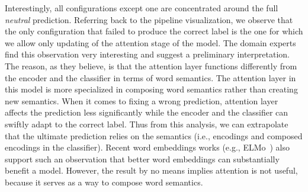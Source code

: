 Interestingly, all configurations except one are concentrated around the full \emph{neutral} prediction. Referring back to the pipeline visualization, we observe that the only configuration that failed to produce the correct label is the one for which we allow only updating of the attention stage of the model.
%
%
The domain experts find this observation very interesting and suggest a preliminary interpretation. The reason, as they believe, is that the attention layer functions differently from the encoder and the classifier in terms of word semantics. The attention layer in this model is more specialized in composing word semantics rather than creating new semantics. When it comes to fixing a wrong prediction, attention layer affects the prediction less significantly while the encoder and the classifier can swiftly adapt to the correct label. Thus from this analysis, we can extrapolate that the ultimate prediction relies on the semantics (i.e., encodings and composed encodings in the classifier). Recent word embeddings works (e.g., ELMo~\cite{salant2017contextualized}) also support such an observation that better word embeddings can substantially benefit a model. However, the result by no means implies attention is not useful, because it serves as a way to compose word semantics.
